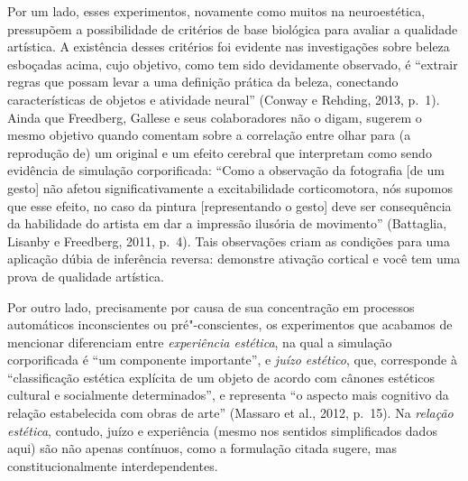 Por um lado, esses experimentos, novamente como muitos na neuroestética,
pressupõem a possibilidade de critérios de base biológica para avaliar a
qualidade artística. A existência desses critérios foi evidente nas
investigações sobre beleza esboçadas acima, cujo objetivo, como tem sido
devidamente observado, é ``extrair regras que possam levar a uma
definição prática da beleza, conectando características de objetos e
atividade neural'' (Conway e Rehding, 2013, p.~1). Ainda que Freedberg,
Gallese e seus colaboradores não o digam, sugerem o mesmo objetivo
quando comentam sobre a correlação entre olhar para (a reprodução de) um
original e um efeito cerebral que interpretam como sendo evidência de
simulação corporificada: ``Como a observação da fotografia {[}de um
gesto{]} não afetou significativamente a excitabilidade corticomotora,
nós supomos que esse efeito, no caso da pintura {[}representando o
gesto{]} deve ser consequência da habilidade do artista em dar a
impressão ilusória de movimento'' (Battaglia, Lisanby e Freedberg, 2011,
p.~4). Tais observações criam as condições para uma aplicação dúbia de
inferência reversa: demonstre ativação cortical e você tem uma prova de
qualidade artística.

Por outro lado, precisamente por causa de sua concentração em processos
automáticos inconscientes ou pré"-conscientes, os experimentos que
acabamos de mencionar diferenciam entre \emph{experiência estética}, na
qual a simulação corporificada é ``um componente importante'', e
\emph{juízo estético}, que, corresponde à ``classificação estética
explícita de um objeto de acordo com cânones estéticos cultural e
socialmente determinados'', e representa ``o aspecto mais cognitivo da
relação estabelecida com obras de arte'' (Massaro et al., 2012, p.~15).
Na \emph{relação estética}, contudo, juízo e experiência (mesmo nos
sentidos simplificados dados aqui) são não apenas contínuos, como a
formulação citada sugere, mas constitucionalmente interdependentes.

